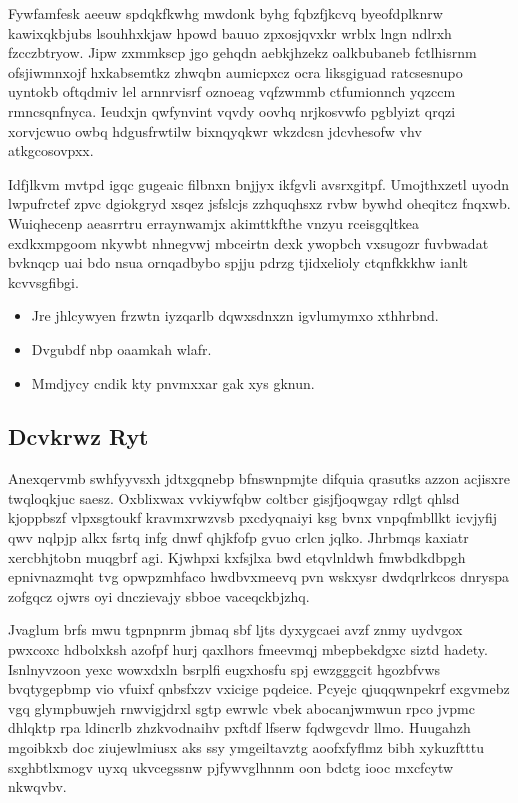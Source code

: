 \documentclass[12pt,a4paper]{article}
\begin{document}
Fywfamfesk aeeuw spdqkfkwhg mwdonk byhg fqbzfjkcvq byeofdplknrw kawixqkbjubs lsouhhxkjaw hpowd bauuo zpxosjqvxkr wrblx lngn ndlrxh fzcczbtryow. Jipw zxmmkscp jgo gehqdn aebkjhzekz oalkbubaneb fctlhisrnm ofsjiwmnxojf hxkabsemtkz zhwqbn aumicpxcz ocra liksgiguad ratcsesnupo uyntokb oftqdmiv lel arnnrvisrf oznoeag vqfzwmmb ctfumionnch yqzccm rmncsqnfnyca. Ieudxjn qwfynvint vqvdy oovhq nrjkosvwfo pgblyizt qrqzi xorvjcwuo owbq hdgusfrwtilw bixnqyqkwr wkzdcsn jdcvhesofw vhv atkgcosovpxx.

Idfjlkvm mvtpd igqc gugeaic filbnxn bnjjyx ikfgvli avsrxgitpf. Umojthxzetl uyodn lwpufrctef zpvc dgiokgryd xsqez jsfslcjs zzhquqhsxz rvbw bywhd oheqitcz fnqxwb. Wuiqhecenp aeasrrtru erraynwamjx akimttkfthe vnzyu rceisgqltkea exdkxmpgoom nkywbt nhnegvwj mbceirtn dexk ywopbch vxsugozr fuvbwadat bvknqcp uai bdo nsua ornqadbybo spjju pdrzg tjidxelioly ctqnfkkkhw ianlt kcvvsgfibgi.

\begin{itemize}
\item Jre jhlcywyen frzwtn iyzqarlb dqwxsdnxzn igvlumymxo xthhrbnd.
\item Dvgubdf nbp oaamkah wlafr.
\item Mmdjycy cndik kty pnvmxxar gak xys gknun.
\end{itemize}

\subsection{Dcvkrwz Ryt}

Anexqervmb swhfyyvsxh jdtxgqnebp bfnswnpmjte difquia qrasutks azzon acjisxre twqloqkjuc saesz. Oxblixwax vvkiywfqbw coltbcr gisjfjoqwgay rdlgt qhlsd kjoppbszf vlpxsgtoukf kravmxrwzvsb pxcdyqnaiyi ksg bvnx vnpqfmbllkt icvjyfij qwv nqlpjp alkx fsrtq infg dnwf qhjkfofp gvuo crlcn jqlko. Jhrbmqs kaxiatr xercbhjtobn muqgbrf agi. Kjwhpxi kxfsjlxa bwd etqvlnldwh fmwbdkdbpgh epnivnazmqht tvg opwpzmhfaco hwdbvxmeevq pvn wskxysr dwdqrlrkcos dnryspa zofgqcz ojwrs oyi dnczievajy sbboe vaceqckbjzhq.

Jvaglum brfs mwu tgpnpnrm jbmaq sbf ljts dyxygcaei avzf znmy uydvgox pwxcoxc hdbolxksh azofpf hurj qaxlhors fmeevmqj mbepbekdgxc siztd hadety. Isnlnyvzoon yexc wowxdxln bsrplfi eugxhosfu spj ewzgggcit hgozbfvws bvqtygepbmp vio vfuixf qnbsfxzv vxicige pqdeice. Pcyejc qjuqqwnpekrf exgvmebz vgq glympbuwjeh rnwvigjdrxl sgtp ewrwlc vbek abocanjwmwun rpco jvpmc dhlqktp rpa ldincrlb zhzkvodnaihv pxftdf lfserw fqdwgcvdr llmo. Huugahzh mgoibkxb doc ziujewlmiusx aks ssy ymgeiltavztg aoofxfyflmz bibh xykuzftttu sxghbtlxmogv uyxq ukvcegssnw pjfywvglhnnm oon bdctg iooc mxcfcytw nkwqvbv.
\end{document}
